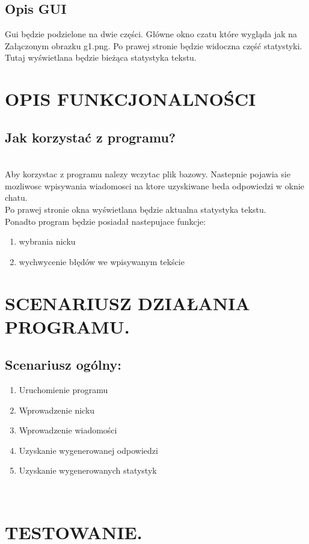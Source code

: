\documentclass[12pt,a4paper]{article}
\begin{document}
\subsection {Opis GUI}
Gui będzie podzielone na dwie części. Główne okno czatu które wygląda jak na Załączonym obrazku g1.png.
Po prawej stronie będzie widoczna część statystyki. Tutaj wyświetlana będzie bieżąca statystyka tekstu.
\section{OPIS FUNKCJONALNOŚCI}
\subsection{Jak korzystać z programu?}
\\
Aby korzystac z programu nalezy wczytac plik bazowy.
Nastepnie pojawia sie mozliwosc wpisywania wiadomosci na ktore uzyskiwane beda odpowiedzi w oknie chatu.\\
Po prawej stronie okna wyświetlana będzie aktualna statystyka tekstu.
\\
Ponadto program będzie posiadał nastepujace funkcje:
\\
\begin{enumerate}
\item
wybrania nicku
\item
wychwycenie błędów we wpisywanym tekście 
\end{enumerate}
\section{SCENARIUSZ DZIAŁANIA PROGRAMU.}
\subsection{Scenariusz ogólny:}
\begin{enumerate}
\item
Uruchomienie programu
\item
Wprowadzenie nicku
\item
Wprowadzenie wiadomości
\item 
Uzyskanie wygenerowanej odpowiedzi
\item
Uzyskanie wygenerowanych statystyk
\end{enumerate}
\\

\section{TESTOWANIE.}
\end{document}

